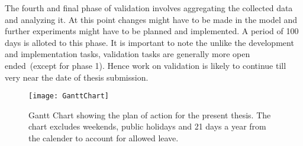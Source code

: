 The fourth and final phase of validation involves aggregating the collected data and analyzing it. At this point changes might have to be made in the model and further experiments might have to be planned and implemented. A period of 100 days is alloted to this phase. It is important to note the unlike the development and implementation tasks, validation tasks are generally more open ended~(except for phase 1). Hence work on validation is likely to continue till very near the date of thesis submission.


\begin{sidewaysfigure}[!tb]
\centering
\texttt{[image: GanttChart]}
\caption[Planned Schedule]{Gantt Chart showing the plan of action for the present thesis. The chart excludes weekends, public holidays and 21 days a year from the calender to account for allowed leave.}
\label{fig:GanttChart}
\end{sidewaysfigure}


